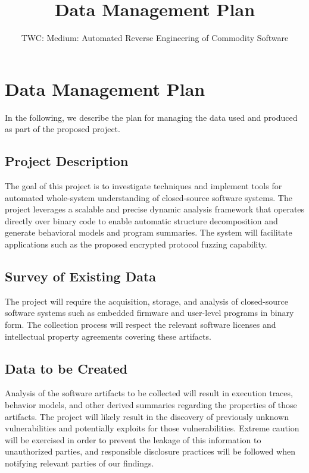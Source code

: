 \documentclass[letterpaper,twoside,11pt,headings=small]{scrartcl}
\newcommand{\thetitle}{TWC: Medium: Automated Reverse Engineering of Commodity Software\xspace}
\begin{document}
\title{Data Management Plan}
\subtitle{\thetitle}
\author{}
\date{}
\maketitle

\section{Data Management Plan}
\label{sec:dmp}

In the following, we describe the plan for managing the data used and produced
as part of the proposed project.

\subsection{Project Description}
\label{sec:dmp:desc}

The goal of this project is to investigate techniques and implement tools for
automated whole-system understanding of closed-source software systems.  The
project leverages a scalable and precise dynamic analysis framework that operates
directly over binary code to enable automatic structure decomposition and generate
behavioral models and program summaries.  The system will facilitate applications
such as the proposed encrypted protocol fuzzing capability.

\subsection{Survey of Existing Data}
\label{sec:dmp:survey}

The project will require the acquisition, storage, and analysis of closed-source
software systems such as embedded firmware and user-level programs in binary form.
The collection process will respect the relevant software licenses and intellectual
property agreements covering these artifacts.

\subsection{Data to be Created}
\label{sec:dmp:created}

Analysis of the software artifacts to be collected will result in execution
traces, behavior models, and other derived summaries regarding the properties
of those artifacts.  The project will likely result in the discovery of
previously unknown vulnerabilities and potentially exploits for those
vulnerabilities.  Extreme caution will be exercised in order to prevent the
leakage of this information to unauthorized parties, and responsible
disclosure practices will be followed when notifying relevant parties of our
findings.
\end{document}
